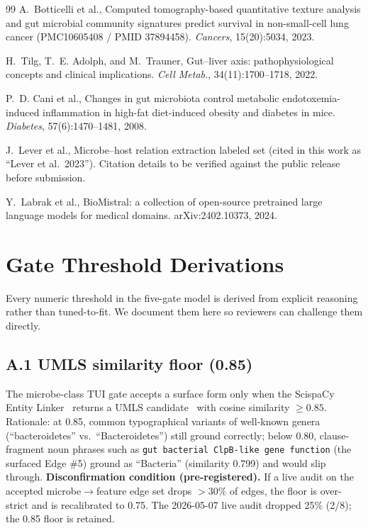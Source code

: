 \documentclass[10pt,twocolumn,letterpaper]{article}
\begin{document}
\begin{thebibliography}{99}
A.~Botticelli et al.,
\newblock Computed tomography-based quantitative texture analysis and gut
microbial community signatures predict survival in non-small-cell lung
cancer (PMC10605408 / PMID 37894458).
\newblock \emph{Cancers}, 15(20):5034, 2023.

H.~Tilg, T.~E. Adolph, and M.~Trauner,
\newblock Gut--liver axis: pathophysiological concepts and clinical
implications.
\newblock \emph{Cell Metab.}, 34(11):1700--1718, 2022.

P.~D. Cani et al.,
\newblock Changes in gut microbiota control metabolic
endotoxemia-induced inflammation in high-fat diet-induced obesity and
diabetes in mice.
\newblock \emph{Diabetes}, 57(6):1470--1481, 2008.

J.~Lever et al.,
\newblock Microbe--host relation extraction labeled set (cited in this
work as ``Lever et al.\ 2023''). \newblock Citation details to be verified
against the public release before submission.

Y.~Labrak et al.,
\newblock BioMistral: a collection of open-source pretrained large language
models for medical domains.
\newblock arXiv:2402.10373, 2024.

\end{thebibliography}

\appendix

\section{Gate Threshold Derivations}
\label{app:thresholds}

Every numeric threshold in the five-gate model is derived from explicit
reasoning rather than tuned-to-fit. We document them here so reviewers can
challenge them directly.

\subsection*{A.1 UMLS similarity floor (0.85)}
\noindent The microbe-class TUI gate accepts a surface form only when the
ScispaCy Entity Linker~\cite{neumann2019scispacy} returns a UMLS
candidate~\cite{bodenreider2004umls} with cosine similarity $\geq 0.85$.
Rationale: at 0.85, common typographical variants of well-known genera
(``bacteroidetes'' vs.\ ``Bacteroidetes'') still ground correctly; below
$0.80$, clause-fragment noun phrases such as
\texttt{gut bacterial ClpB-like gene function} (the surfaced Edge \#5)
ground as ``Bacteria'' (similarity 0.799) and would slip through.
\textbf{Disconfirmation condition (pre-registered).} If a live audit on the
accepted microbe$\rightarrow$feature edge set drops $>30\%$ of edges, the
floor is over-strict and is recalibrated to 0.75. The 2026-05-07 live
audit dropped 25\% (2/8); the 0.85 floor is retained.
\end{document}
